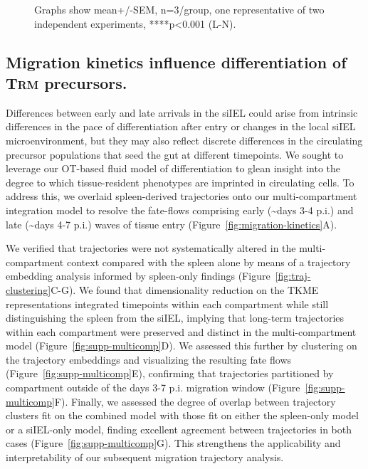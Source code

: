\begin{figure}[p]
{Graphs show mean+/-SEM, n=3/group, one representative of two independent experiments, ****p\textless{}0.001 (L-N).
    }
    \label{fig:multicomp-ot}
\end{figure}
\clearpage

\subsection{Migration kinetics influence differentiation of T\textsc{rm} precursors. }

Differences between early and late arrivals in the siIEL could arise from intrinsic differences in the pace of differentiation after entry or changes in the local siIEL microenvironment, but they may also reflect discrete differences in the circulating precursor populations that seed the gut at different timepoints. We sought to leverage our OT-based fluid model of differentiation to glean insight into the degree to which tissue-resident phenotypes are imprinted in circulating cells. To address this, we overlaid spleen-derived trajectories onto our multi-compartment integration model to resolve the fate-flows comprising early (\textasciitilde{}days 3-4 p.i.) and late (\textasciitilde{}days 4-7 p.i.) waves of tissue entry (Figure~\ref{fig:migration-kinetics}A).

We verified that trajectories were not systematically altered in the multi-compartment context compared with the spleen alone by means of a trajectory embedding analysis informed by spleen-only findings (Figure~\ref{fig:traj-clustering}C-G). We found that dimensionality reduction on the TKME representations integrated timepoints within each compartment while still distinguishing the spleen from the siIEL, implying that long-term trajectories within each compartment were preserved and distinct in the multi-compartment model (Figure~\ref{fig:supp-multicomp}D). We assessed this further by clustering on the trajectory embeddings and visualizing the resulting fate flows (Figure~\ref{fig:supp-multicomp}E), confirming that trajectories partitioned by compartment outside of the days 3-7 p.i. migration window (Figure~\ref{fig:supp-multicomp}F). Finally, we assessed the degree of overlap between trajectory clusters fit on the combined model with those fit on either the spleen-only model or a siIEL-only model, finding excellent agreement between trajectories in both cases (Figure~\ref{fig:supp-multicomp}G). This strengthens the applicability and interpretability of our subsequent migration trajectory analysis.

